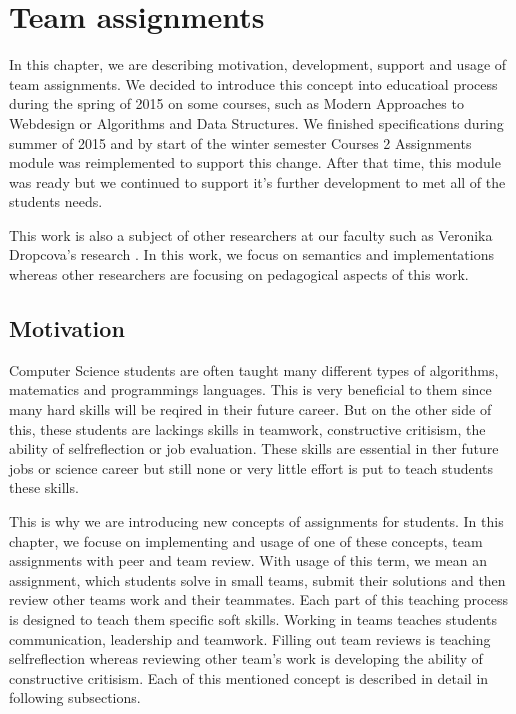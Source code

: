 \chapter{Team assignments}
\label{sec:teamprojects}
In this chapter, we are describing motivation, development, support and usage of team assignments. We decided to introduce this concept into educatioal process during the spring of 2015 on some courses, such as Modern Approaches to Webdesign or Algorithms and Data Structures. We finished specifications during summer of 2015 and by start of the winter semester   Courses 2 Assignments module was reimplemented to support this change. After that time, this module was ready but we continued to support it's further development to met all of the students needs.

This work is also a subject of other researchers at our faculty such as Veronika Dropcova's research \cite{dropcova}. In this work, we focus on semantics and implementations whereas other researchers are focusing on pedagogical aspects of this work.


\section{Motivation}

Computer Science students are often taught many different types of algorithms, matematics and programmings languages. This is very beneficial to them since many hard skills will be reqired in their future career. But on the other side of this, these students are lackings skills in teamwork, constructive critisism, the ability of self\-reflection or job evaluation.  These skills are essential in ther future jobs or science career but still none or very little effort is put to teach students these skills. 

This is why we are introducing new concepts of assignments for students.  In this chapter, we focuse on implementing and usage of one of these concepts, team assignments with peer and team review. With usage of this term, we mean an assignment, which students solve in small teams, submit their solutions and then review other teams work and their teammates. Each part of this teaching process is designed to teach them specific soft skills. Working in teams teaches students communication, leadership and teamwork. Filling out team reviews is teaching self\-reflection whereas reviewing other team's work is developing the ability of constructive critisism. Each of this mentioned concept is described in detail in following subsections.


